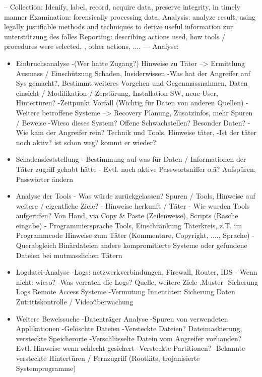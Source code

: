 --
Collection: Idenify, label, record, acquire data, preserve integrity, in timely manner
Examination: forensically processing data, 
Analysis: analyze result, using legally justifiable methods and techniques to derive useful information zur unterstützung des falles
Reporting: describing actions used, how tools / procedures were selected, , other actions, ....
---
Analyse:
\begin{itemize}
\item Einbruchsanalyse 
	-(Wer hatte Zugang?) Hinweise zu Täter --> Ermittlung Ausmass / Einschützung Schaden, Insiderwissen
	-Was hat der Angreifer auf Sys gemacht?, Bestimmt weiteres Vorgehen und Gegenmassnahmen, Daten einsicht / Modifikation / Zerstörung, Installation SW, neue User, Hintertüren?
	-Zeitpunkt Vorfall (Wichtig für Daten von anderen Quellen)
	-Weitere betroffene Systeme --> Recovery Planung, Zusatzinfos, mehr Spuren / Beweise
	-Wieso dieses System? Offene Schwachstellen? Besonder Daten?
	-Wie kam der Angreifer rein? Technik und Tools, Hinweise täter, 
	-Ist der täter noch aktiv? ist schon weg? kommt er wieder?
\item Schadensfeststellung
	- Bestimmung auf was für Daten / Informationen der Täter zugriff gehabt hätte
	- Evtl. noch aktive Passwortsniffer o.ä? Aufspüren, Passwörter ändern
\item Analyse der Tools
	- Was würde zurückgelassen? Spuren / Tools, Hinweise auf weitere / eigentliche Ziele?
	- Hinweise herkunft / Täter
	- Wie wurden Tools aufgerufen? Von Hand, via Copy \& Paste (Zeilenweise), Scripts (Rasche eingabe)
	- Programmiersprache Tools, Einschränkung Täterkreis, z.T. im Programmcode Hinweise zum Täter (Kommentare, Copyright, ...., Sprache)
	- Querabgleich Binärdateien andere kompromitierte Systeme oder gefundene Dateien bei mutmasslichen Tätern
\item Logdatei-Analyse
	-Logs: netzwerkverbindungen, Firewall, Router, IDS - Wenn nicht: wieso?
	-Was verraten die Logs? Quelle, weitere Ziele ,Muster
	-Sicherung Logs Remote Access Systeme
	-Vermutung Innentäter: Sicherung Daten Zutrittskontrolle / Videoüberwachung
\item Weitere Beweissuche
	-Datenträger Analyse
	-Spuren von verwendeten Applikationen
	-Gelöschte Dateien
	-Versteckte Dateien? Dateimaskierung, versteckte Speicherorte
	-Verschlüsselte Datein vom Angreifer vorhanden? Evtl. Hinweise wenn schlecht gesichert
	-Versteckte Partitionen?
	-Bekannte versteckte Hintertüren / Fernzugriff (Rootkits, trojanisierte Systemprogramme)
\end{itemize}

